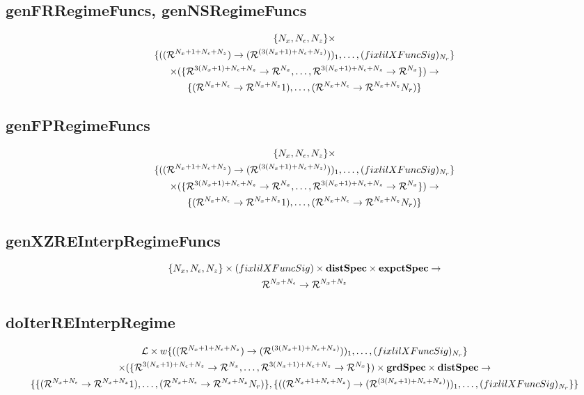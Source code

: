 \documentclass[12pt]{article}
\begin{document}
\subsection{genFRRegimeFuncs, genNSRegimeFuncs}
\label{sec:genfrregimefunc}



{\small
\begin{gather*}
\{\numX,\numEps,\numZ\}\times\\
\{(\lilXRegimeFuncSig)_1,\ldots,(\lilXFuncSig)_{\numR}\}  \\
 \times (\eqnRegimeFuncSig )\rightarrow\\
\frfpnsRegimeFuncSig
\end{gather*}
}








\subsection{genFPRegimeFuncs}
\label{sec:genfpregimefunc}




{\small
\begin{gather*}
\{\numX,\numEps,\numZ\}\times\\
\{(\lilXRegimeFuncSig)_1,\ldots,(\lilXFuncSig)_{\numR}\}  \\
 \times (\eqnRegimeFuncSig )\rightarrow\\
\frfpnsRegimeFuncSig
\end{gather*}
}




\subsection{genXZREInterpRegimeFuncs}
\label{sec:genfpfunc}
\begin{gather*}
\{\numX,\numEps,\numZ\}\times(\lilXFuncSig)\times \dstSpec \times  \expctSpec   \rightarrow\\
\frfpnsFuncSig
\end{gather*}



\subsection{doIterREInterpRegime}
\label{sec:doiterreinterp}

\begin{gather*}
  \linMod \times 
w\{(\lilXRegimeFuncSig)_1,\ldots,(\lilXFuncSig)_{\numR}\}  \\
 \times (\eqnRegimeFuncSig ) \times \grdSpec \times \dstSpec \rightarrow\\
\{\frfpnsRegimeFuncSig, \{(\lilXRegimeFuncSig)_1,\ldots,(\lilXFuncSig)_{\numR}\}\}
\end{gather*}
\end{document}
